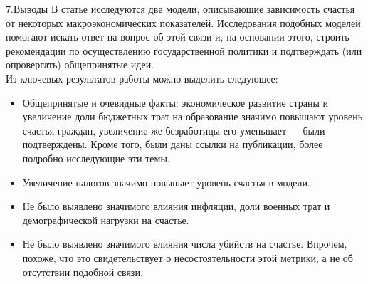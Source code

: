 \documentclass[aspectratio=169]{beamer}
\begin{document}
\begin{frame}{7.Выводы}
   \small
   В статье исследуются две модели, описывающие зависимость счастья от некоторых макроэкономических показателей. Исследования подобных моделей помогают искать ответ на вопрос об этой связи и, на основании этого, строить рекомендации по осуществлению государственной политики и подтверждать (или опровергать) общепринятые идеи.
        \\
        Из ключевых результатов работы можно выделить следующее:
        \begin{itemize}
            \item Общепринятые и очевидные факты: экономическое развитие страны и увеличение доли бюджетных трат на образование значимо повышают уровень счастья граждан, увеличение же безработицы его уменьшает --- были подтверждены. Кроме того, были даны ссылки на публикации, более подробно исследующие эти темы.
            \item Увеличение налогов значимо повышает уровень счастья в модели.
            \item Не было выявлено значимого влияния инфляции, доли военных трат и демографической нагрузки на счастье.
            \item Не было выявлено значимого влияния числа убийств на счастье. Впрочем, похоже, что это свидетельствует о несостоятельности этой метрики, а не об отсутствии подобной связи.
        \end{itemize}
        

    \normalsize


\end{frame}
\end{document}
